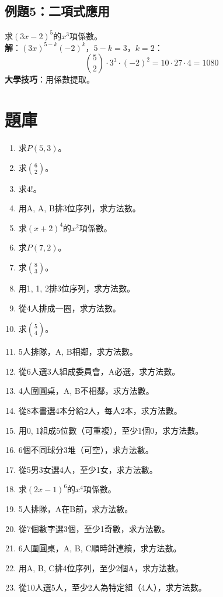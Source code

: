 \subsection{例題5：二項式應用}
求$(3x - 2)^5$的$x^3$項係數。\\
\textbf{解}：$(3x)^{5-k} (-2)^k$，$5-k=3$，$k=2$：
\[
\binom{5}{2} \cdot 3^3 \cdot (-2)^2 = 10 \cdot 27 \cdot 4 = 1080
\]
\textbf{大學技巧}：用係數提取。



\section{題庫}
\begin{enumerate}[label=\arabic*.]
    \item 求$P(5, 3)$。
    \item 求$\binom{6}{2}$。
    \item 求$4!$。
    \item 用A, A, B排3位序列，求方法數。
    \item 求$(x + 2)^4$的$x^2$項係數。
    \item 求$P(7, 2)$。
    \item 求$\binom{8}{3}$。
    \item 用1, 1, 2排3位序列，求方法數。
    \item 從4人排成一圈，求方法數。
    \item 求$\binom{5}{4}$。
    \item 5人排隊，A, B相鄰，求方法數。
    \item 從6人選3人組成委員會，A必選，求方法數。
    \item 4人圍圓桌，A, B不相鄰，求方法數。
    \item 從8本書選4本分給2人，每人2本，求方法數。
    \item 用0, 1組成5位數（可重複），至少1個0，求方法數。
    \item 6個不同球分3堆（可空），求方法數。
    \item 從5男3女選4人，至少1女，求方法數。
    \item 求$(2x - 1)^6$的$x^4$項係數。
    \item 5人排隊，A在B前，求方法數。
    \item 從7個數字選3個，至少1奇數，求方法數。
    \item 6人圍圓桌，A, B, C順時針連續，求方法數。
    \item 用A, B, C排4位序列，至少2個A，求方法數。
    \item 從10人選5人，至少2人為特定組（4人），求方法數。

\end{enumerate}
